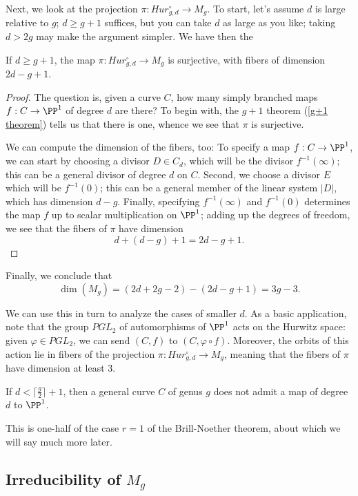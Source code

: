 Next, we look at the projection $\pi : Hur^\circ_{g,d} \to M_g$. To start, let's assume $d$ is large relative to $g$; $d \geq g+1$ suffices, but you can take $d$ as large as you like; taking $d > 2g$ may make the argument simpler. We have then the

\begin{proposition}
If $d \geq g+1$, the map $\pi : Hur^\circ_{g,d} \to M_g$ is surjective, with fibers of dimension $2d-g+1$.
\end{proposition}

\begin{proof}
The question is, given a curve $C$, how many simply branched maps $f : C \to \PP^1$ of degree $d$ are there? To begin with, the $g+1$ theorem (\ref{g+1 theorem}) tells us that there is one, whence we see that $\pi$ is surjective. 

We can compute the dimension of the fibers, too: To specify a map $f : C \to \PP^1$, we can start by choosing a divisor $D \in C_d$, which will be the divisor $f^{-1}(\infty)$; this can be a general divisor of degree $d$ on $C$. Second, we choose a divisor $E$ which will be $f^{-1}(0)$; this can be a general member of the linear system $|D|$, which has dimension $d-g$. Finally, specifying $f^{-1}(\infty)$ and $f^{-1}(0)$ determines the map $f$ up to scalar multiplication on $\PP^1$; adding up the degrees of freedom, we see that the fibers of $\pi$ have dimension
$$
d + (d-g) + 1 = 2d-g+1.
$$ 
\end{proof}

Finally, we conclude that
$$
\dim(M_g) = (2d+2g-2) - (2d - g + 1) = 3g-3.
$$

We can use this in turn to analyze the cases of smaller $d$. As a basic application, note that the group $PGL_2$ of automorphisms of $\PP^1$ acts on the Hurwitz space: given $\varphi \in PGL_2$, we can send $(C,f)$ to $(C, \varphi \circ f)$. Moreover, the orbits of this action lie in fibers of the projection $\pi : Hur^\circ_{g,d} \to M_g$, meaning that the fibers of $\pi$ have dimension at least 3. 

\begin{corollary}\label{branched cover BN}
If $d < \lceil \frac{g}{2} \rceil + 1$, then a general curve $C$ of genus $g$ does not admit a map of degree $d$ to $\PP^1$.
\end{corollary}

This is one-half of the case $r=1$ of the Brill-Noether theorem, about which we will say much more later.

\subsection{Irreducibility of $M_g$}

